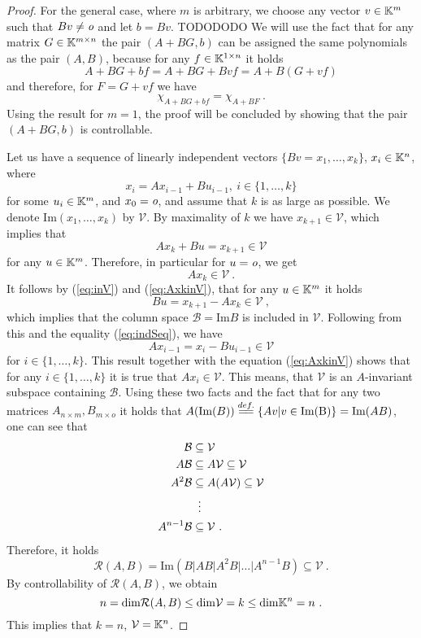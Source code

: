 \begin{proof}
    For the general case, where $m$ is arbitrary, we choose any vector $v\in\mathbb{K}^m$ such that $Bv\neq \textit{o}$ and let $b=Bv$. TODODODO We will use the fact that for any matrix $G\in\mathbb{K}^{m\times n}$ the pair $(A+BG,b)$ can be assigned the same polynomials as the pair $(A,B)$, because for any $f\in\mathbb{K}^{1\times n}$ it holds
    $${A+BG+bf}={A+BG+Bvf}={A+B(G+vf)}$$
    and therefore, for $F=G+vf$ we have 
    $$\chi_{A+BG+bf}=\chi_{A+BF}\ .$$
    Using the result for $m=1$, the proof will be concluded by showing that the pair $(A+BG,b)$ is controllable.
       
    Let us have a sequence of linearly independent vectors $\{Bv=x_1,\ldots,x_k\}$, $x_i\in\mathbb{K}^n$, where
    \begin{equation}
    \label{eq:indSeq}
        x_{i}=Ax_{i-1}+Bu_{i-1},\ i\in\{1,\ldots,k\}
    \end{equation}
    for some $u_i\in\mathbb{K}^m$, and $x_0=\textit{o}$, and assume that $k$ is as large as possible. We denote $\text{Im}(x_1,\ldots,x_k)$ by $\mathcal{V}$. By maximality of $k$ we have $x_{k+1}\in\mathcal{V}$, which implies that
    \begin{equation}
    \label{eq:inV}    
        Ax_k+Bu=x_{k+1}\in\mathcal{V}
    \end{equation}
    for any $u\in\mathbb{K}^m$. Therefore, in particular for $u=\textit{o}$, we get 
    \begin{equation}
    \label{eq:AxkinV}
        Ax_k\in\mathcal{V}\ .
    \end{equation}
    It follows by (\ref{eq:inV}) and (\ref{eq:AxkinV}), that for any $u\in\mathbb{K}^m$ it holds
    $$Bu=x_{k+1}-Ax_k\in\mathcal{V}\ ,$$
    which implies that the column space $\mathcal{B}=\text{Im}B$ is included in $\mathcal{V}$. Following from this and the equality (\ref{eq:indSeq}), we have 
    $$Ax_{i-1}=x_i-Bu_{i-1}\in\mathcal{V}$$
    for $i\in\{1,\ldots,k\}$. This result together with the equation (\ref{eq:AxkinV}) shows that for any $i\in\{1,\ldots,k\}$ it is true that $Ax_i\in\mathcal{V}$. This means, that $\mathcal{V}$ is an $A$-invariant subspace containing $\mathcal{B}$. Using these two facts and the fact that for any two matrices $A_{n\times m},B_{m\times o}$ it holds that $A(\text{Im}(B))\stackrel{def.}{=\joinrel=}\{Av|v\in\text{Im(B)}\}=\text{Im}(AB)$, one can see that 
    \begin{align*}
        \mathcal{B}&\subseteq\mathcal{V} \\
        A\mathcal{B}&\subseteq A\mathcal{V}\subseteq\mathcal{V} \\
        A^2\mathcal{B}&\subseteq A(A\mathcal{V})\subseteq\mathcal{V} \\
        &\vdotswithin{\subseteq} \\
        A^{n-1}\mathcal{B}&\subseteq\mathcal{V}
        \ .
    \end{align*}
    Therefore, it holds
    $$\mathcal{R}(A,B)=\text{Im}(B|AB|A^2B|\ldots|A^{n-1}B)\subseteq\mathcal{V}\ .$$
    By controllability of $\mathcal{R}(A,B)$, we obtain
    $$n=\text{dim}\mathcal{R}(A,B)\leq\text{dim}\mathcal{V}=k\leq\text{dim}\K^n=n\ .$$
    This implies that $k=n$, $\mathcal{V}=\mathbb{K}^n$.


\end{proof}
